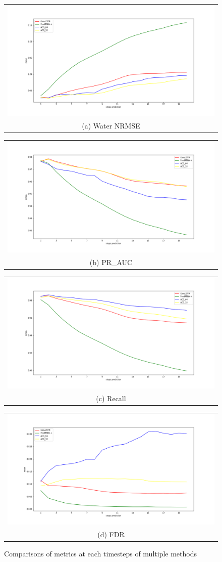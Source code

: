 \begin{figure}
    \begin{center}
    \begin{tabular}[b]{c}
      \includegraphics[width=.4\linewidth]{figures/chap4_w_nrmse_timesteps.png} \\
      \small (a) Water NRMSE
    \end{tabular}
    \begin{tabular}[b]{c}
      \includegraphics[width=.4\linewidth]{figures/chap4_pr_auc_timesteps.png} \\
      \small (b) PR\_AUC
    \end{tabular}
    \begin{tabular}[b]{c}
        \includegraphics[width=.4\linewidth]{figures/chap4_recall_timesteps.png} \\
        \small (c) Recall
    \end{tabular} 
    \begin{tabular}[b]{c}
        \includegraphics[width=.4\linewidth]{figures/chap4_FDR_timesteps.png} \\
        \small (d) FDR
    \end{tabular}
    \end{center}
    \caption[]{Comparisons of metrics at each timesteps of multiple methods}
    \label{fig:metrics-comparisons-timesteps}
\end{figure}

